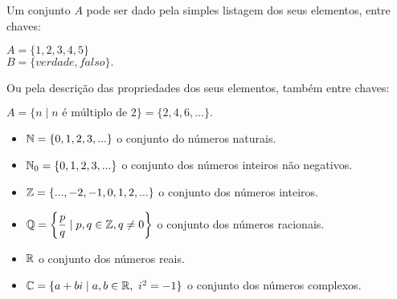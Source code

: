 \documentclass{beamer}
\begin{document}
    \begin{frame}
        Um conjunto $A$ pode ser dado pela simples listagem dos seus elementos, entre chaves:\pause
            \begin{center}
                $A = \{1,2,3,4,5\}$\pause\\
                $B = \{verdade, falso\}.$\pause
            \end{center}
            

        Ou pela descri{\c c}{\~a}o das propriedades dos seus elementos, também  entre chaves:\pause
        \begin{center}
            $A = \{n \mid n \mbox{ \'e m{\'u}ltiplo de } 2\} = \{2,4,6,...\}.$
        \end{center}

        \begin{itemize}
            \item $\mathbb{N} = \{0,1,2,3,...\}$ o conjunto do n{\'u}meros naturais.\pause
            \item $\mathbb{N}_0 = \{0,1,2,3,...\}$ o conjunto dos n{\'u}meros inteiros n{\~a}o negativos.\pause
            \item $\mathbb{Z} = \{...,-2,-1,0,1,2,...\}$ o conjunto dos n{\'u}meros inteiros.\pause
            \item $\mathbb{Q} = \left\{\dfrac{p}{q} \mid p,q \in \mathbb{Z}, q \neq 0 \right\}$ o conjunto dos n{\'u}meros racionais.\pause
            \item $\mathbb{R} $ o conjunto dos n{\'u}meros reais.\pause
            \item $\mathbb{C} = \{a + bi \mid a,b \in \mathbb{R},\ i^2 = -1\}$ o conjunto dos n\'umeros complexos.
        \end{itemize}
    \end{frame}
\end{document}
